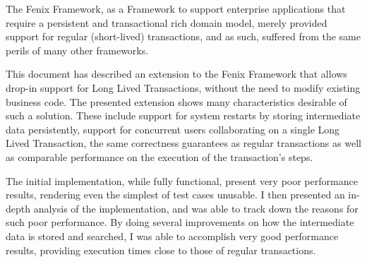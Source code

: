 \documentclass{llncs}
\begin{document}
The Fenix Framework, as a Framework to support enterprise applications
that require a persistent and transactional rich domain model, merely
provided support for regular (short-lived) transactions, and as such,
suffered from the same perils of many other frameworks.

This document has described an extension to the Fenix Framework that
allows drop-in support for Long Lived Transactions, without the need
to modify existing business code. The presented extension shows
many characteristics desirable of such a solution. These include
support for system restarts by storing intermediate data persistently,
support for concurrent users collaborating on a single Long Lived
Transaction, the same correctness guarantees as regular transactions
as well as comparable performance on the execution of the
transaction's steps.

The initial implementation, while fully functional, present very poor
performance results, rendering even the simplest of test cases
unusable. I then presented an in-depth analysis of the implementation,
and was able to track down the reasons for such poor performance. By
doing several improvements on how the intermediate data is stored and
searched, I was able to accomplish very good performance results,
providing execution times close to those of regular transactions.

 
\end{document}
